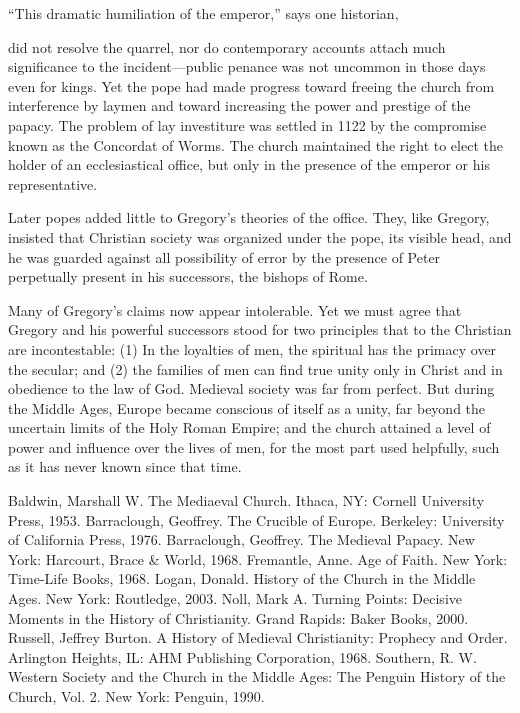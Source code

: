 “This dramatic humiliation of the emperor,” says one historian,

\begin{blockquote}
did not resolve the quarrel, nor do contemporary accounts attach much significance to the
incident—public penance was not uncommon in those days even for kings. Yet the pope had made
progress toward freeing the church from interference by laymen and toward increasing the power and
prestige of the papacy. The problem of lay investiture was settled in 1122 by the compromise known
as the Concordat of Worms. The church maintained the right to elect the holder of an ecclesiastical
office, but only in the presence of the emperor or his representative.
\end{blockquote}

Later popes added little to Gregory’s theories of the office. They, like Gregory, insisted that
Christian society was organized under the pope, its visible head, and he was guarded against all
possibility of error by the presence of Peter perpetually present in his successors, the bishops of
Rome.

Many of Gregory’s claims now appear intolerable. Yet we must agree that Gregory and his powerful
successors stood for two principles that to the Christian are incontestable: (1) In the loyalties of
men, the spiritual has the primacy over the secular; and (2) the families of men can find true unity
only in Christ and in obedience to the law of God. Medieval society was far from perfect. But during
the Middle Ages, Europe became conscious of itself as a unity, far beyond the uncertain limits of
the Holy Roman Empire; and the church attained a level of power and influence over the lives of men,
for the most part used helpfully, such as it has never known since that time.

\begin{readinglist}
\entry Baldwin, Marshall W. The Mediaeval Church. Ithaca, NY: Cornell University Press, 1953.
\entry Barraclough, Geoffrey. The Crucible of Europe. Berkeley: University of California Press,
  1976.
\entry Barraclough, Geoffrey. The Medieval Papacy. New York: Harcourt, Brace \& World, 1968.
\entry Fremantle, Anne. Age of Faith. New York: Time-Life Books, 1968.
\entry *Logan, Donald. History of the Church in the Middle Ages. New York: Routledge, 2003.
\entry Noll, Mark A. Turning Points: Decisive Moments in the History of Christianity. Grand Rapids:
  Baker Books, 2000.
\entry Russell, Jeffrey Burton. A History of Medieval Christianity: Prophecy and Order. Arlington
  Heights, IL: AHM Publishing Corporation, 1968.
\entry *Southern, R. W. Western Society and the Church in the Middle Ages: The Penguin History of
  the Church, Vol. 2. New York: Penguin, 1990.
\end{readinglist}
